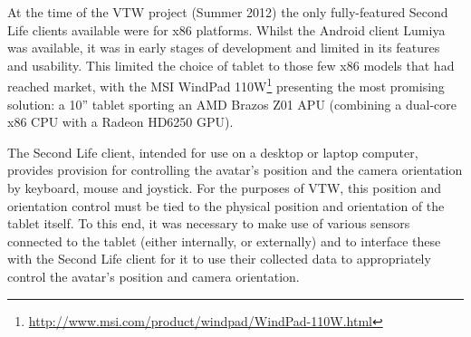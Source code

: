 \newcommand{\WindpadFootnote}{\footnote{\url{http://www.msi.com/product/windpad/WindPad-110W.html}}}


At the time of the VTW project (Summer 2012) the only fully-featured Second Life clients available were for x86 platforms. Whilst the Android client Lumiya\LumiyaFootnote{} was available, it was in early stages of development and limited in its features and usability. This limited the choice of tablet to those few x86 models that had reached market, with the MSI WindPad 110W\WindpadFootnote{} presenting the most promising solution: a 10'' tablet sporting an AMD Brazos Z01 APU (combining a dual-core x86 CPU with a Radeon HD6250 GPU).

The Second Life client, intended for use on a desktop or laptop computer, provides provision for controlling the avatar's position and the camera orientation by keyboard, mouse and joystick. For the purposes of VTW, this position and orientation control must be tied to the physical position and orientation of the tablet itself. To this end, it was necessary to make use of various sensors connected to the tablet (either internally, or externally) and to interface these with the Second Life client for it to use their collected data to appropriately control the avatar's position and camera orientation.






